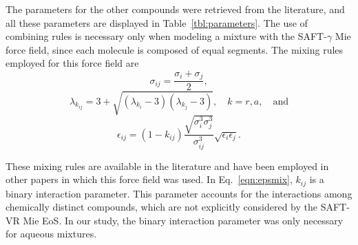 \documentclass[preprint]{elsarticle}
\begin{document}
	The parameters for the other compounds were retrieved from the literature, and all these parameters are displayed in Table~\ref{tbl:parameters}. The use of combining rules is necessary only when modeling a mixture with the SAFT-$\gamma$ Mie force field, since each molecule is composed of equal segments. The mixing rules employed for this force field are \cite{lafitte2013}
	\begin{equation}
	\sigma_{ij} =\frac{\sigma_i+\sigma_j}{2},
	\label{eqn:sigmamix}
	\end{equation}
	\begin{equation}
	\lambda_{k_{ij}} = 3 + \sqrt{(\lambda_{k_i}-3)(\lambda_{k_j}-3)}, \quad k=r,a, \quad \text{and}
	\label{eqn:lambdamix}
	\end{equation}
	\begin{equation}
	\label{eqn:epsmix}
	\epsilon_{ij} =(1-k_{ij})\frac{\sqrt{\sigma_i^3\sigma_j^3}}{\sigma_{ij}^3}\sqrt{\epsilon_i\epsilon_j}.
	\end{equation}
	
	These mixing rules are available in the literature and have been employed in other papers in which this force field was used. In Eq.~\eqref{eqn:epsmix}, $k_{ij}$ is a binary interaction parameter. This parameter accounts for the interactions among chemically distinct compounds, which are not explicitly considered by the SAFT-VR Mie EoS. In our study, the binary interaction parameter was only necessary for aqueous mixtures.
	
\end{document}
